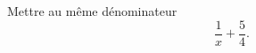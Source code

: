 
\begin{exercice}\label{exoSeconde-0016}

    Mettre au même dénominateur
    \begin{equation}
        \frac{1}{ x }+\frac{ 5 }{ 4 }.
    \end{equation}

\end{exercice}
